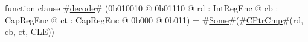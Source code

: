 function clause #\hyperref[zdecode]{decode}# (0b010010 @ 0b01110 @ rd : IntRegEnc @ cb : CapRegEnc @ ct : CapRegEnc @ 0b000 @ 0b011) = #\hyperref[zSome]{Some}#(#\hyperref[zCPtrCmp]{CPtrCmp}#(rd, cb, ct, CLE))
